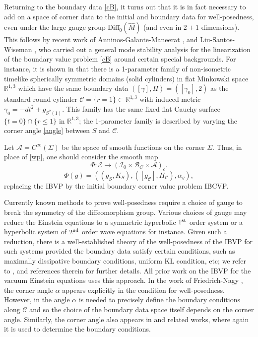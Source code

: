 \documentclass[10pt]{amsart}
\renewcommand{\a}{\alpha}
\newcommand{\g}{\gamma}
\newcommand{\Si}{\Sigma}
\newcommand{\cA}{{\mathcal A}}
\newcommand{\cC}{{\mathcal C}}
\newcommand{\cB}{{\mathcal B}}
\newcommand{\cE}{{\mathcal E}}
\newcommand{\cI}{\mathcal I}
\newcommand{\bR}{\mathbb R}
\newcommand{\Diff}{\mathrm{Diff}}
\newcommand{\be}{\begin{equation}}
\newcommand{\ee}{\end{equation}}
\renewcommand{\to}{\rightarrow}
\renewcommand{\hat}{\widehat}
\newcommand{\<}{\langle}
\renewcommand{\>}{\rangle}
\theoremstyle{plain}
\theoremstyle{remark}
\theoremstyle{definition}
\numberwithin{equation}{section}
\begin{document}
   Returning to the boundary data \eqref{cB}, it turns out that it is in fact necessary to add on a space of corner data to the initial and 
boundary data for well-posedness, even under the large gauge group $\Diff_0(\hat M)$ (and even in $2+1$ dimensions). This follows by recent work of 
Anninos-Galante-Maneerat \cite{AGM1}, \cite{AGM2} and Liu-Santos-Wiseman \cite{LSW}, who carried out a general mode stability analysis for 
the linearization of the boundary value problem \eqref{cB} around certain special backgrounds. For instance, it is shown in \cite{LSW} that there is a 
1-parameter family of non-isometric timelike spherically symmetric domains (solid cylinders)  in flat Minkowski space $\bR^{1,3}$ which have the 
same boundary data $([\g], H) = ([\g_0], 2)$ as the standard round cylinder $\cC = \{r = 1\} \subset \bR^{1,3}$ with induced metric 
$\g_0 = -dt^2 + g_{S^2(1)}$. This family has the same fixed flat Cauchy surface $\{t = 0\}\cap \{r \leq 1\}$ in $\bR^{1,3}$; the 1-parameter family is 
described by varying the corner angle \eqref{angle} between $S$ and $\cC$. 

\medskip 

    Let $\cA = C^{\infty}(\Si)$ be the space of smooth functions on the corner $\Si$. Thus, in place of \eqref{wp}, one should consider the smooth map   
\be \label{Phi}
\Phi: \cE \to (\cI_0 \times \cB_C \times \cA)_c.
\ee
$$\Phi(g) = ((g_S, K_S), ([g_{\cC}], H_{\cC}), \a_g),$$
replacing the IBVP by the initial boundary corner value problem IBCVP. 

  Currently known methods to prove well-posedness require a choice of gauge to break the symmetry of the diffeomorphism group. 
Various choices of gauge may reduce the Einstein equations to a symmetric hyperbolic $1^{\rm st}$ order system or a hyperbolic system of 
$2^{\rm nd}$ order wave equations for instance. Given such a reduction, there is a well-established theory of the well-posedness of the IBVP 
for such systems provided the boundary data satisfy certain conditions, such as maximally dissipative boundary conditions, uniform KL condition, 
etc; we refer to \cite{BS}, \cite{Sa} and references therein  for further details. All prior work on the IBVP for the vacuum Einstein equations uses this 
approach. In the work of Friedrich-Nagy \cite{FN}, the corner angle $\a$ appears explicitly in the condition for well-posedness. However, in \cite{FN} 
the angle $\a$ is needed to precisely define the boundary conditions along $\cC$ and so the choice of the boundary data space itself depends on the corner 
angle. Similarly, the corner angle also appears in \cite{KRSW1} and related works, where again it is used to determine the boundary conditions. 
\end{document}
